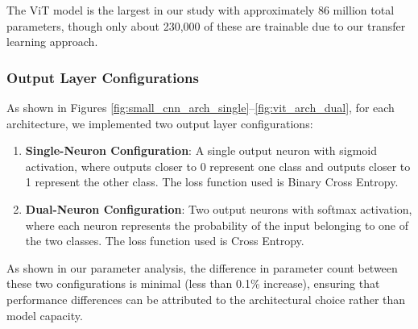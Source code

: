The ViT model is the largest in our study with approximately 86 million total parameters, though only about 230,000 of these are trainable due to our transfer learning approach.

\subsubsection{Output Layer Configurations}

As shown in Figures \ref{fig:small_cnn_arch_single}--\ref{fig:vit_arch_dual}, for each architecture, we implemented two output layer configurations:

\begin{enumerate}
\item \textbf{Single-Neuron Configuration}: A single output neuron with sigmoid activation, where outputs closer to 0 represent one class and outputs closer to 1 represent the other class. The loss function used is Binary Cross Entropy.

\item \textbf{Dual-Neuron Configuration}: Two output neurons with softmax activation, where each neuron represents the probability of the input belonging to one of the two classes. The loss function used is Cross Entropy.
\end{enumerate}

As shown in our parameter analysis, the difference in parameter count between these two configurations is minimal (less than 0.1\% increase), ensuring that performance differences can be attributed to the architectural choice rather than model capacity.
